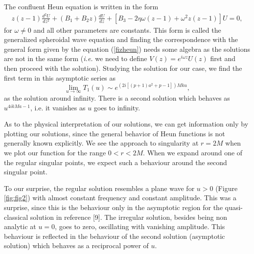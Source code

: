 \documentclass{article}
\begin{document}
The confluent Heun equation is written in the form
\begin{eqnarray}
z(z-1)\frac{d^{2}U}{dz^{2}}+(B_{1}+B_{2}z)\frac{dU}{dz}+\left[B_{3}-2\eta\omega(z-1)+\omega^{2}z(z-1)\right]U=0,
\end{eqnarray}
for $\omega\neq0$ and all other parameters are constants. This
form is called the generalized spheroidal wave equation and
finding the correspondence with the general form given by the
equation (\ref{fizheun}) needs some algebra as the solutions are
not in the same form ({\it i.e.} we need to define
$V(z)=e^{i\omega z}U(z)$ first and then proceed with the
solution). Studying the solution for our case, we find the first term in this asymptotic series as
\begin{equation}
\lim_{u\rightarrow \infty}T_1(u) \sim e^{(2i[(p+1)a^2+p-1])Mku},
\end{equation}
as the solution around infinity. There is a second  solution which
behaves as $u^{4ikMa-1}$, i.e. it  vanishes as $u$ goes to
infinity.

As to the physical interpretation of our solutions, we
can get information only by plotting our solutions, since the
general behavior of Heun functions is not generally known
explicitly. We see the approach to singularity at $r=2M$ when we
plot our function for the range $0<r< 2M$. When we expand around
one of the regular singular points, we expect such a behaviour
around the second singular point.

To our surprise, the regular solution resembles a plane wave for
$u>0$ (Figure \ref{fig:fig2}) with almost constant frequency and
constant amplitude. This was a surprise, since this is the
behaviour only in the asymptotic region for the quasi-classical
solution in reference [9].  The irregular solution, besides being
non analytic at $u=0$, goes to  zero, oscillating with vanishing
amplitude.  This behaviour is reflected in the behaviour of the
second solution (asymptotic solution) which behaves as a reciprocal
power of $u$.
\end{document}
